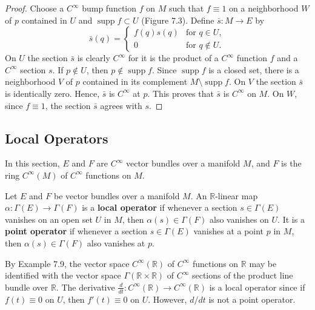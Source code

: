 \begin{example}
\begin{proof}
Choose a $C^{\infty}$ bump function $f$ on $M$ such that $f \equiv 1$ on a neighborhood $W$ of $p$ contained in $U$ and $\operatorname{supp} f \subset U$ (Figure 7.3). Define $\bar{s} : M \to E$ by
\[
\bar{s}(q) = 
\begin{cases}
f(q)s(q) & \text{for } q \in U, \\
0 & \text{for } q \notin U.
\end{cases}
\]
On $U$ the section $\bar{s}$ is clearly $C^{\infty}$ for it is the product of a $C^{\infty}$ function $f$ and a $C^{\infty}$ section $s$. If $p \notin U$, then $p \notin \operatorname{supp} f$. Since $\operatorname{supp} f$ is a closed set, there is a neighborhood $V$ of $p$ contained in its complement $M \setminus \operatorname{supp} f$. On $V$ the section $\bar{s}$ is identically zero. Hence, $\bar{s}$ is $C^{\infty}$ at $p$. This proves that $\bar{s}$ is $C^{\infty}$ on $M$. On $W$, since $f \equiv 1$, the section $\bar{s}$ agrees with $s$.
\end{proof}


\subsection{Local Operators}

In this section, $E$ and $F$ are $C^{\infty}$ vector bundles over a manifold $M$, and $F$ is the ring $C^{\infty}(M)$ of $C^{\infty}$ functions on $M$.

\begin{definition}
Let $E$ and $F$ be vector bundles over a manifold $M$. An $\mathbb{R}$-linear map $\alpha : \Gamma(E) \to \Gamma(F)$ is a \textbf{local operator} if whenever a section $s \in \Gamma(E)$ vanishes on an open set $U$ in $M$, then $\alpha(s) \in \Gamma(F)$ also vanishes on $U$. It is a \textbf{point operator} if whenever a section $s \in \Gamma(E)$ vanishes at a point $p$ in $M$, then $\alpha(s) \in \Gamma(F)$ also vanishes at $p$.
\end{definition}

\begin{example}
By Example 7.9, the vector space $C^{\infty}(\mathbb{R})$ of $C^{\infty}$ functions on $\mathbb{R}$ may be identified with the vector space $\Gamma(\mathbb{R} \times \mathbb{R})$ of $C^{\infty}$ sections of the product line bundle over $\mathbb{R}$. The derivative $\frac{d}{dt} : C^{\infty}(\mathbb{R}) \to C^{\infty}(\mathbb{R})$ is a local operator since if $f(t) \equiv 0$ on $U$, then $f'(t) \equiv 0$ on $U$. However, $d/dt$ is not a point operator.
\end{example}


\end{example}
